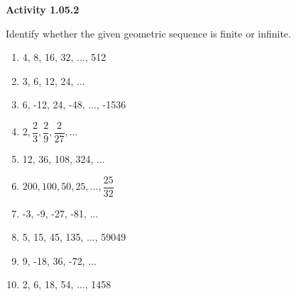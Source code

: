 \vspace{0.3ex}
\noindent\textbf{Activity 1.05.2}

\vspace{0.2ex}

Identify whether the given geometric sequence is finite or infinite.
\begin{multicols}{2}
\begin{enumerate}
    \item 4, 8, 16, 32, ..., 512
    \item 3, 6, 12, 24, ...
    \item 6, -12, 24, -48, ..., -1536
    \item \(2, \dfrac{2}{3}, \dfrac{2}{9}, \dfrac{2}{27}, ...\)
    \item 12, 36, 108, 324, ...
    \item \(200, 100, 50, 25, ..., \dfrac{25}{32}\)
    \item -3, -9, -27, -81, ...
    \item 5, 15, 45, 135, ..., 59049
    \item 9, -18, 36, -72, ...
    \item 2, 6, 18, 54, ..., 1458
\end{enumerate}
\end{multicols}
